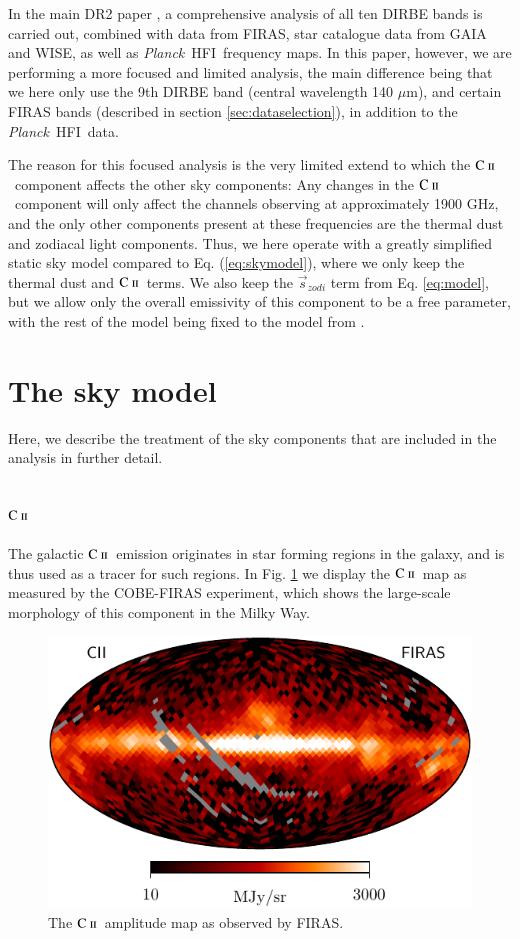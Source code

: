\documentclass{aa}
\newcommand{\mathsc}[1]{{\normalfont\textsc{#1}}}
\def\Planck{\textit{Planck}}
\newcommand{\s}[0]{\vec{s}}
\newcommand{\cii}{\ensuremath{\mathsc {C\ ii}}}
\newcommand{\CII}{\ensuremath{\mathsc{C\ ii}}}
\newcommand{\hfi}[0]{HFI}
\begin{document}
In the main DR2 paper \citep{CG02_01}, a comprehensive analysis of all ten
DIRBE bands is carried out, combined with data from FIRAS, star catalogue data
from GAIA and WISE, as well as \Planck\ \hfi\ frequency maps. In this paper,
however, we are performing a more focused and limited analysis, the main
difference being that we here only use the 9th DIRBE band (central wavelength
140 $\mu$m), and certain FIRAS bands (described in section
\ref{sec:dataselection}), in addition to the \Planck\ \hfi\ data.

The reason for this focused analysis is the very limited extend to which the
\cii\ component affects the other sky components: Any changes in the \cii\
component will only affect the channels observing at approximately 1900 GHz,
and the only other components present at these frequencies are the thermal dust
and zodiacal light components. Thus, we here operate with a greatly simplified
static sky model compared to Eq. (\ref{eq:skymodel}), where we only keep the
thermal dust and \cii\ terms. We also keep the $\s_{zodi}$ term from Eq.
\ref{eq:model}, but we allow only the overall emissivity of this component to
be a free parameter, with the rest of the model being fixed to the model from
\citet{CG02_02}.

\clearpage
\section{The sky model}
Here, we describe the treatment of the sky components that are included in the
analysis in further detail.

\label{sec:skymodel}
\subsection{\cii}
The galactic \CII\ emission originates in star forming regions in the
galaxy, and is thus used as a tracer for such regions. In Fig.
\ref{fig:cii_firas} we display the \CII\ map as measured by the COBE-FIRAS
experiment\citep{fixsen:1994,mather:1999}, which shows the large-scale
morphology of this component in the Milky Way.

\begin{figure}
    \centering
    \includegraphics[width=\columnwidth]{figures/init_CII_firas_n16_v20.pdf}
    \caption{The \CII\ amplitude map as observed by FIRAS.}
    \label{fig:cii_firas}
\end{figure}
\end{document}
